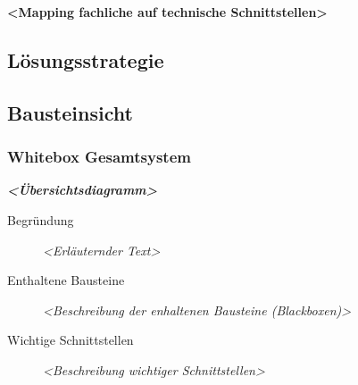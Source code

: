 \textbf{\textless{}Mapping fachliche auf technische
Schnittstellen\textgreater{}}

\subsection{Lösungsstrategie}\label{section-solution-strategy}

\subsection{Bausteinsicht}\label{section-building-block-view}

\subsubsection{Whitebox Gesamtsystem}\label{_whitebox_gesamtsystem}

\emph{\textbf{\textless{}Übersichtsdiagramm\textgreater{}}}

\begin{description}
\item[Begründung]
\emph{\textless{}Erläuternder Text\textgreater{}}
\item[Enthaltene Bausteine]
\emph{\textless{}Beschreibung der enhaltenen Bausteine
(Blackboxen)\textgreater{}}
\item[Wichtige Schnittstellen]
\emph{\textless{}Beschreibung wichtiger Schnittstellen\textgreater{}}
\end{description}











